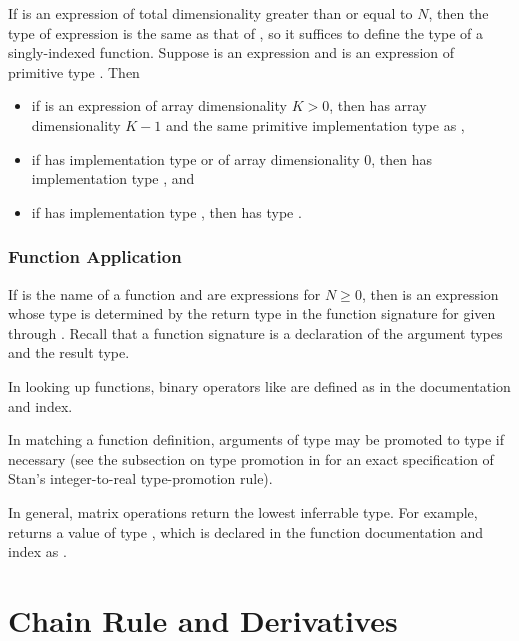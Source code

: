 If  is an expression of total dimensionality greater than or
equal to $N$, then the type of expression  is the
same as that of , so it suffices to define the type
of a singly-indexed function.  Suppose  is an expression and
 is an expression of primitive type .  Then
%
\begin{itemize}
\item if  is an expression of array dimensionality $K > 0$,
  then  has array dimensionality $K-1$ and the same
  primitive implementation type as ,
%
\item if  has implementation type  or
   of array dimensionality 0, then  has
  implementation type , and
%
\item if  has implementation type , then
   has type .
\end{itemize}

\subsubsection{Function Application}

If  is the name of a function and  are
expressions for $N \geq 0$, then  is an expression
whose type is determined by the return type in the function signature
for  given  through .  Recall that a
function signature is a declaration of the argument types and the
result type.  

In looking up functions, binary operators like  are
defined as  in the documentation and index.

In matching a function definition, arguments of type  may be
promoted to type  if necessary (see the subsection on type
promotion in  for an exact
specification of Stan's integer-to-real type-promotion rule).

In general, matrix operations return the lowest inferrable type.  For
example,  returns a value of type
, which is declared in the function documentation and index
as .



\section{Chain Rule and Derivatives}

